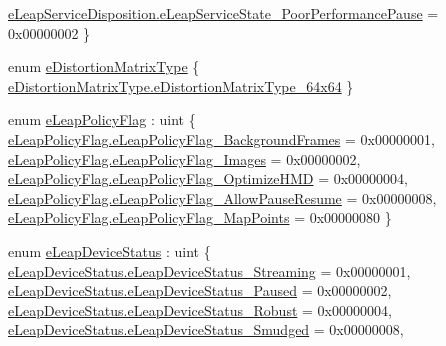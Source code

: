 \begin{DoxyCompactItemize}
\mbox{\hyperlink{namespace_leap_internal_ab2f23b85c583724a090dca2c20793d85a4b6b37a01574c4d79405a0e6b4a5dd3c}{e\+Leap\+Service\+Disposition.\+e\+Leap\+Service\+State\+\_\+\+Poor\+Performance\+Pause}} = 0x00000002
 \}
\item 
enum \mbox{\hyperlink{namespace_leap_internal_a1d2bfda35c62f188e88e18ac41c51e98}{e\+Distortion\+Matrix\+Type}} \{ \mbox{\hyperlink{namespace_leap_internal_a1d2bfda35c62f188e88e18ac41c51e98a8d89a644eebba1533b7749dbe48f9ee8}{e\+Distortion\+Matrix\+Type.\+e\+Distortion\+Matrix\+Type\+\_\+64x64}}
 \}
\item 
enum \mbox{\hyperlink{namespace_leap_internal_abf43a1780899ea756a686f838b7117be}{e\+Leap\+Policy\+Flag}} \+: uint \{ \newline
\mbox{\hyperlink{namespace_leap_internal_abf43a1780899ea756a686f838b7117beaa79816ee68ea1722676788728bd13bbf}{e\+Leap\+Policy\+Flag.\+e\+Leap\+Policy\+Flag\+\_\+\+Background\+Frames}} = 0x00000001, 
\mbox{\hyperlink{namespace_leap_internal_abf43a1780899ea756a686f838b7117bea788960dd526a51b220f34cb5dd6379e0}{e\+Leap\+Policy\+Flag.\+e\+Leap\+Policy\+Flag\+\_\+\+Images}} = 0x00000002, 
\mbox{\hyperlink{namespace_leap_internal_abf43a1780899ea756a686f838b7117beaaedda6bc90b80e1c2c765140aed4de0a}{e\+Leap\+Policy\+Flag.\+e\+Leap\+Policy\+Flag\+\_\+\+Optimize\+H\+MD}} = 0x00000004, 
\mbox{\hyperlink{namespace_leap_internal_abf43a1780899ea756a686f838b7117bea76eb67651b7c29ee80cfabf8c3693566}{e\+Leap\+Policy\+Flag.\+e\+Leap\+Policy\+Flag\+\_\+\+Allow\+Pause\+Resume}} = 0x00000008, 
\newline
\mbox{\hyperlink{namespace_leap_internal_abf43a1780899ea756a686f838b7117bea0bb45d81584a36e1299b2e805b14e114}{e\+Leap\+Policy\+Flag.\+e\+Leap\+Policy\+Flag\+\_\+\+Map\+Points}} = 0x00000080
 \}
\item 
enum \mbox{\hyperlink{namespace_leap_internal_a16b28ea79f39b6205c514b3e9b075bed}{e\+Leap\+Device\+Status}} \+: uint \{ \newline
\mbox{\hyperlink{namespace_leap_internal_a16b28ea79f39b6205c514b3e9b075bedab338e86a0000e9693ba15d852b903440}{e\+Leap\+Device\+Status.\+e\+Leap\+Device\+Status\+\_\+\+Streaming}} = 0x00000001, 
\mbox{\hyperlink{namespace_leap_internal_a16b28ea79f39b6205c514b3e9b075beda514383da53705aad13ddf8863b9f985b}{e\+Leap\+Device\+Status.\+e\+Leap\+Device\+Status\+\_\+\+Paused}} = 0x00000002, 
\mbox{\hyperlink{namespace_leap_internal_a16b28ea79f39b6205c514b3e9b075beda385e35b4ad99eac18159817565d01e6c}{e\+Leap\+Device\+Status.\+e\+Leap\+Device\+Status\+\_\+\+Robust}} = 0x00000004, 
\mbox{\hyperlink{namespace_leap_internal_a16b28ea79f39b6205c514b3e9b075bedacff74225de7ce2c8458319d27c9db9c7}{e\+Leap\+Device\+Status.\+e\+Leap\+Device\+Status\+\_\+\+Smudged}} = 0x00000008, 

\end{DoxyCompactItemize}
